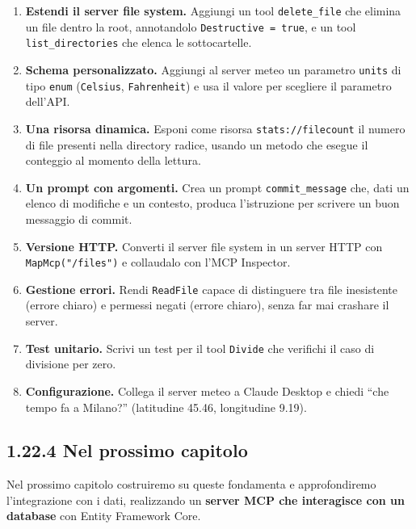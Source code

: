 \documentclass[
  italian,
  10pt,
]{book}
\providecommand{\tightlist}{%
  \setlength{\itemsep}{0pt}\setlength{\parskip}{0pt}}
\begin{document}
\begin{enumerate}
\def\labelenumi{\arabic{enumi}.}
\tightlist
\item
  \textbf{Estendi il server file system.} Aggiungi un tool
  \texttt{delete\_file} che elimina un file dentro la root, annotandolo
  \texttt{Destructive\ =\ true}, e un tool \texttt{list\_directories}
  che elenca le sottocartelle.
\item
  \textbf{Schema personalizzato.} Aggiungi al server meteo un parametro
  \texttt{units} di tipo \texttt{enum} (\texttt{Celsius},
  \texttt{Fahrenheit}) e usa il valore per scegliere il parametro
  dell'API.
\item
  \textbf{Una risorsa dinamica.} Esponi come risorsa
  \texttt{stats://filecount} il numero di file presenti nella directory
  radice, usando un metodo che esegue il conteggio al momento della
  lettura.
\item
  \textbf{Un prompt con argomenti.} Crea un prompt
  \texttt{commit\_message} che, dati un elenco di modifiche e un
  contesto, produca l'istruzione per scrivere un buon messaggio di
  commit.
\item
  \textbf{Versione HTTP.} Converti il server file system in un server
  HTTP con \texttt{MapMcp("/files")} e collaudalo con l'MCP Inspector.
\item
  \textbf{Gestione errori.} Rendi \texttt{ReadFile} capace di
  distinguere tra file inesistente (errore chiaro) e permessi negati
  (errore chiaro), senza far mai crashare il server.
\item
  \textbf{Test unitario.} Scrivi un test per il tool \texttt{Divide} che
  verifichi il caso di divisione per zero.
\item
  \textbf{Configurazione.} Collega il server meteo a Claude Desktop e
  chiedi ``che tempo fa a Milano?'' (latitudine 45.46, longitudine
  9.19).
\end{enumerate}

\subsection{1.22.4 Nel prossimo capitolo}\label{nel-prossimo-capitolo}

Nel prossimo capitolo costruiremo su queste fondamenta e approfondiremo
l'integrazione con i dati, realizzando un \textbf{server MCP che
interagisce con un database} con Entity Framework Core.

\backmatter
\end{document}
